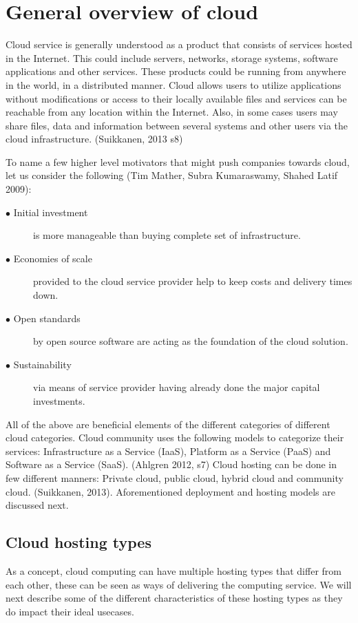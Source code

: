 \documentclass{article}
\begin{document}
\section{General overview of cloud}
Cloud service is generally understood as a product that consists of services hosted in the Internet. This could include servers, networks, storage systems, software applications and other services. These products could be running from anywhere in the world, in a distributed manner. Cloud allows users to utilize applications without modifications or access to their locally available files and services can be reachable from any location within the Internet. Also, in some cases users may share files, data and information between several systems and other users via the cloud infrastructure.
(Suikkanen, 2013 s8)
\par
To name a few higher level motivators that might push companies towards cloud, let us consider the following (Tim Mather, Subra Kumaraswamy, Shahed Latif 2009):
\begin{description}
        \item[$\bullet$ Initial investment] is more manageable than buying complete set of infrastructure.
        \item[$\bullet$ Economies of scale] provided to the cloud service provider help to keep costs and delivery times down.
        \item[$\bullet$ Open standards] by open source software are acting as the foundation of the cloud solution.
        \item[$\bullet$ Sustainability] via means of service provider having already done the major capital investments.
\end{description}
All of the above are beneficial elements of the different categories of different cloud categories.
Cloud community uses the following models to categorize their services: Infrastructure as a Service (IaaS), Platform as a Service (PaaS) and Software as a Service (SaaS). (Ahlgren 2012, s7)
Cloud hosting can be done in few different manners: Private cloud, public cloud, hybrid cloud and community cloud. (Suikkanen, 2013).
Aforementioned deployment and hosting models are discussed next.
\subsection{Cloud hosting types}
As a concept, cloud computing can have multiple hosting types that differ from each other, these can be seen as ways of delivering the computing service. We will next describe some of the different characteristics of these hosting types as they do impact their ideal usecases.
\end{document}
